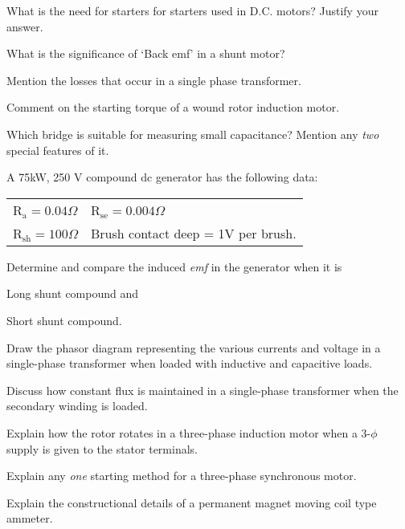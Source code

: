 \markC
\ene

\newpage

\sub{\subj}
\maxtime

\partA

\iitem What is the need for starters for starters used in D.C. motors? Justify your answer.
\item What is the significance of `Back emf' in a shunt motor?
\item Mention the losses that occur in a single phase transformer.
\item Comment on the starting torque of a wound rotor induction motor.
\item Which bridge is suitable for measuring small capacitance? Mention any {\em two} special
  features of it.

\markA
\partB

\item A 75kW, 250 V compound dc generator has the following data:

\hspace{1cm}
\begin{tabular}{ l l }
  R$_\text{a} = 0.04 \Omega$ & R$_\text{se} = 0.004 \Omega$\\
  R$_\text{sh} = 100 \Omega$ & Brush contact deep = 1V per brush. \\
\end{tabular}

Determine and compare the induced \emph{emf} in the generator when it is

\iitem Long shunt compound and
\item Short shunt compound.
\ene
\item Draw the phasor diagram representing the various currents and voltage in a single-phase transformer
  when loaded with inductive and capacitive loads.
\item Discuss how constant flux is maintained in a single-phase transformer when the secondary winding is
  loaded.
\item Explain how the rotor rotates in a three-phase induction motor when a 3-$\phi$ supply is given to
  the stator terminals.
\item Explain any {\em one} starting method for a three-phase synchronous motor.

\newpage \again

\item Explain the constructional details of a permanent magnet moving coil type ammeter.

